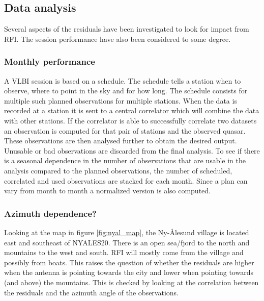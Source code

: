 \documentclass[twoside=semi,fontsize=12pt,paper=a4,titlepage=on]{kv_article}
\begin{document}
\subsection{Data analysis}

Several aspects of the residuals have been investigated to look for impact from RFI. The session performance have also been considered to some degree.

\subsubsection{Monthly performance}
A VLBI session is based on a schedule. The schedule tells a station when to observe, where to point in the sky and for how long. The schedule consists for multiple such planned observations for multiple stations. When the data is recorded at a station it is sent to a central correlator which will combine the data with other stations. If the correlator is able to successfully correlate two datasets an observation is computed for that pair of stations and the observed quasar. These observations are then analysed further to obtain the desired output. Unusable or bad observations are discarded from the final analysis. To see if there is a seasonal dependence in the number of observations that are usable in the analysis compared to the planned observations, the number of scheduled, correlated and used observations are stacked for each month. Since a plan can vary from month to month a normalized version is also computed.    

\subsubsection{Azimuth dependence?}
Looking at the map in figure \ref{fig:nyal_map}, the Ny-Ålesund village is located east and southeast of NYALES20. There is an open sea/fjord to the north and mountains to the west and south. RFI will mostly come from the village and possibly from boats. This raises the question of whether the residuals are higher when the antenna is pointing towards the city and lower when pointing towards (and above) the mountains. This is checked by looking at the correlation between the residuals and the azimuth angle of the observations.
\end{document}
